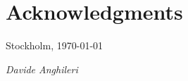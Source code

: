 \chapter*{Acknowledgments}



\vspace{1.0cm}

\noindent
Stockholm, \today

\noindent
\textit{Davide Anghileri}